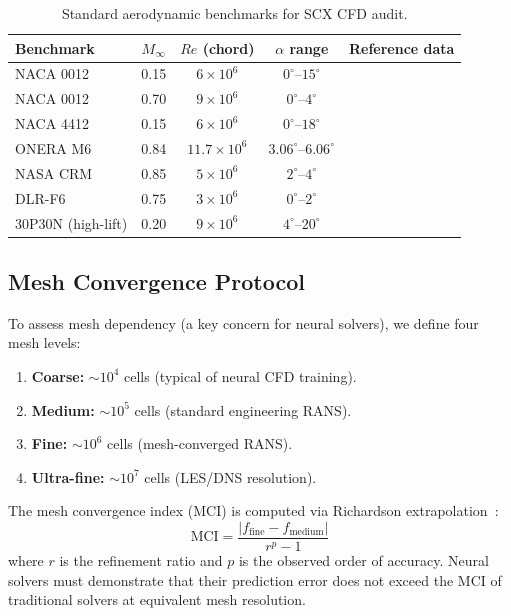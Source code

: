\documentclass[11pt,a4paper]{article}
\theoremstyle{definition}
\theoremstyle{remark}
\begin{document}
\begin{table}[htbp]
\centering
\caption{Standard aerodynamic benchmarks for SCX CFD audit.}
\label{tab:benchmarks}
\begin{tabular}{@{}lcccc@{}}
\toprule
Benchmark & $M_\infty$ & $Re$ (chord) & $\alpha$ range & Reference data \\
\midrule
NACA 0012 & 0.15 & $6 \times 10^6$ & $0^\circ$--$15^\circ$ &~\citet{ladson1988acquired} \\
NACA 0012 & 0.70 & $9 \times 10^6$ & $0^\circ$--$4^\circ$ &~\citet{harris1981two} \\
NACA 4412 & 0.15 & $6 \times 10^6$ & $0^\circ$--$18^\circ$ &~\citet{colesc1945tests} \\
ONERA M6 & 0.84 & $11.7 \times 10^6$ & $3.06^\circ$--$6.06^\circ$ &~\citet{schmitt2007advanced} \\
NASA CRM & 0.85 & $5 \times 10^6$ & $2^\circ$--$4^\circ$ &~\citet{vassberg2008summary} \\
DLR-F6 & 0.75 & $3 \times 10^6$ & $0^\circ$--$2^\circ$ &~\citet{laflin2005summary} \\
30P30N (high-lift) & 0.20 & $9 \times 10^6$ & $4^\circ$--$20^\circ$ &~\citet{murayama2006comparison} \\
\bottomrule
\end{tabular}
\end{table}

\subsection{Mesh Convergence Protocol}

To assess mesh dependency (a key concern for neural solvers), we define four mesh levels:

\begin{enumerate}[label=(\roman*)]
    \item \textbf{Coarse:} $\sim 10^4$ cells (typical of neural CFD training).
    \item \textbf{Medium:} $\sim 10^5$ cells (standard engineering RANS).
    \item \textbf{Fine:} $\sim 10^6$ cells (mesh-converged RANS).
    \item \textbf{Ultra-fine:} $\sim 10^7$ cells (LES/DNS resolution).
\end{enumerate}

\noindent The mesh convergence index (MCI) is computed via Richardson extrapolation~\citep{roache1998verification}:
\begin{equation}
\text{MCI} = \frac{|f_{\text{fine}} - f_{\text{medium}}|}{r^p - 1}
\label{eq:mci}
\end{equation}
where $r$ is the refinement ratio and $p$ is the observed order of accuracy.
Neural solvers must demonstrate that their prediction error does not exceed the MCI of traditional solvers at equivalent mesh resolution.
\end{document}
